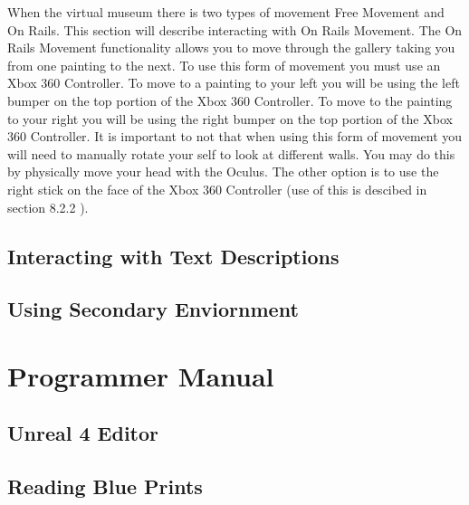 When the virtual museum there is two types of movement Free Movement and On Rails. This section will describe interacting with On Rails Movement. The On Rails Movement functionality allows you to move through the gallery taking you from one painting to the next. To use this form of movement you must use an Xbox 360 Controller. To move to a painting to your left you will be using the left bumper on the top portion of the Xbox 360 Controller. To move to the painting to your right you will be using the right bumper on the top portion of the Xbox 360 Controller. It is important to not that when using this form of movement you will need to manually rotate your self to look at different walls. You may do this by physically move your head with the Oculus. The other option is to use the right stick on the face of the Xbox 360 Controller (use of this is descibed in section 8.2.2 ). 

\subsection{Interacting with Text Descriptions}

\subsection{Using Secondary Enviornment}


\section{Programmer Manual}

\subsection{Unreal 4 Editor}

\subsection{Reading Blue Prints}


